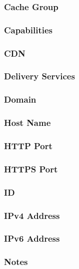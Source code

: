 \subsubsection{Cache Group}

\subsubsection{Capabilities}

\subsubsection{CDN}

\subsubsection{Delivery Services}

\subsubsection{Domain}

\subsubsection{Host Name}

\subsubsection{HTTP Port}

\subsubsection{HTTPS Port}

\subsubsection{ID}

\subsubsection{IPv4 Address}

\subsubsection{IPv6 Address}

\subsubsection{Notes}

